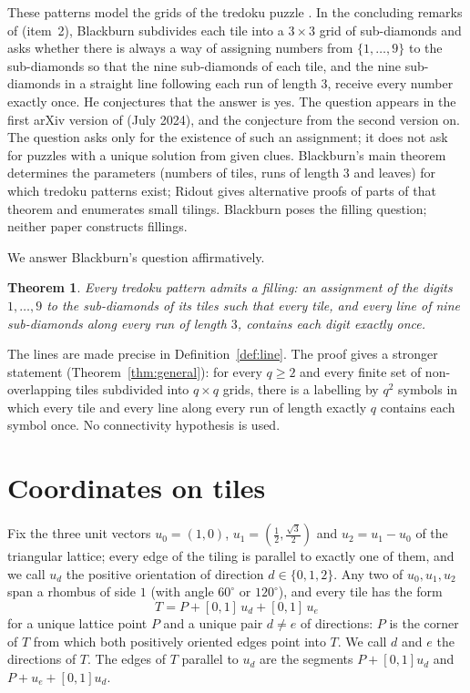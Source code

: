 \documentclass[11pt,a4paper]{amsart}
\newtheorem{theorem}{Theorem}[section]
\theoremstyle{definition}
\theoremstyle{remark}
\begin{document}
These patterns model the grids of the tredoku puzzle \cite{Mindome}. In the concluding remarks of \cite{Blackburn} (item~2), Blackburn subdivides each tile into a $3\times 3$ grid of sub-diamonds and asks whether there is always a way of assigning numbers from $\{1,\dots,9\}$ to the sub-diamonds so that the nine sub-diamonds of each tile, and the nine sub-diamonds in a straight line following each run of length $3$, receive every number exactly once. He conjectures that the answer is yes. The question appears in the first arXiv version of \cite{Blackburn} (July 2024), and the conjecture from the second version on. The question asks only for the existence of such an assignment; it does not ask for puzzles with a unique solution from given clues. Blackburn's main theorem determines the parameters (numbers of tiles, runs of length $3$ and leaves) for which tredoku patterns exist; Ridout \cite{Ridout} gives alternative proofs of parts of that theorem and enumerates small tilings. Blackburn poses the filling question; neither paper constructs fillings.

We answer Blackburn's question affirmatively.

\begin{theorem}\label{thm:main}
Every tredoku pattern admits a filling: an assignment of the digits $1,\dots,9$ to the sub-diamonds of its tiles such that every tile, and every line of nine sub-diamonds along every run of length $3$, contains each digit exactly once.
\end{theorem}

The lines are made precise in Definition~\ref{def:line}. The proof gives a stronger statement (Theorem~\ref{thm:general}): for every $q\ge 2$ and every finite set of non-overlapping tiles subdivided into $q\times q$ grids, there is a labelling by $q^2$ symbols in which every tile and every line along every run of length exactly $q$ contains each symbol once. No connectivity hypothesis is used.

\section{Coordinates on tiles}

Fix the three unit vectors $u_0=(1,0)$, $u_1=(\tfrac12,\tfrac{\sqrt3}{2})$ and $u_2=u_1-u_0$ of the triangular lattice; every edge of the tiling is parallel to exactly one of them, and we call $u_d$ the positive orientation of direction $d\in\{0,1,2\}$. Any two of $u_0,u_1,u_2$ span a rhombus of side $1$ (with angle $60^\circ$ or $120^\circ$), and every tile has the form
\[
T = P + [0,1]\,u_d + [0,1]\,u_e
\]
for a unique lattice point $P$ and a unique pair $d\ne e$ of directions: $P$ is the corner of $T$ from which both positively oriented edges point into $T$. We call $d$ and $e$ the directions of $T$. The edges of $T$ parallel to $u_d$ are the segments $P+[0,1]u_d$ and $P+u_e+[0,1]u_d$.
\end{document}
